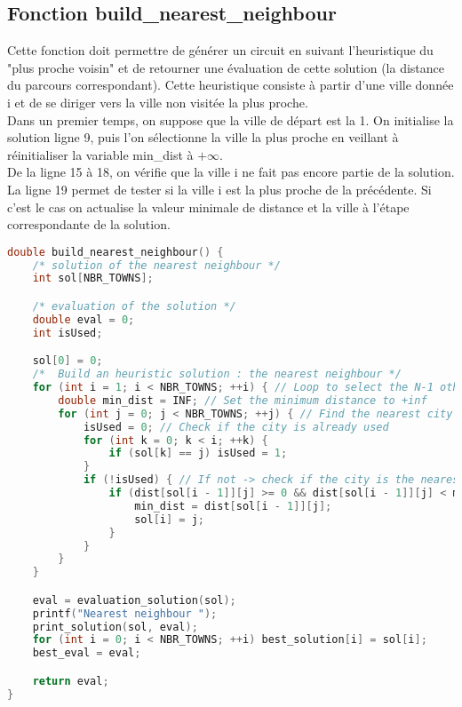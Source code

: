 \documentclass[a4paper]{article}
\begin{document}
\subsection{Fonction build\_nearest\_neighbour}

Cette fonction doit permettre de générer un circuit en suivant l'heuristique du "plus proche voisin" et de retourner une évaluation de cette solution (la distance du parcours correspondant). Cette heuristique consiste à partir d'une ville donnée i et de se diriger vers la ville non visitée la plus proche.\\

Dans un premier temps, on suppose que la ville de départ est la 1. On initialise la solution ligne 9, puis l'on sélectionne la ville la plus proche en veillant à réinitialiser la variable min\_dist à $+\infty$.\\ De la ligne 15 à 18, on vérifie que la ville i ne fait pas encore partie de la solution. La ligne 19 permet de tester si la ville i est la plus proche de la précédente. Si c'est le cas on actualise la valeur minimale de distance et la ville à l'étape correspondante de la solution.

\begin{lstlisting}[language=C]
    double build_nearest_neighbour() {
    /* solution of the nearest neighbour */
    int sol[NBR_TOWNS];

    /* evaluation of the solution */
    double eval = 0;
    int isUsed;

    sol[0] = 0;
    /*  Build an heuristic solution : the nearest neighbour */
    for (int i = 1; i < NBR_TOWNS; ++i) { // Loop to select the N-1 other cities' rank in the solution
        double min_dist = INF; // Set the minimum distance to +inf
        for (int j = 0; j < NBR_TOWNS; ++j) { // Find the nearest city for each step
            isUsed = 0; // Check if the city is already used
            for (int k = 0; k < i; ++k) {
                if (sol[k] == j) isUsed = 1;
            }
            if (!isUsed) { // If not -> check if the city is the nearest
                if (dist[sol[i - 1]][j] >= 0 && dist[sol[i - 1]][j] < min_dist) {
                    min_dist = dist[sol[i - 1]][j];
                    sol[i] = j;
                }
            }
        }
    }

    eval = evaluation_solution(sol);
    printf("Nearest neighbour ");
    print_solution(sol, eval);
    for (int i = 0; i < NBR_TOWNS; ++i) best_solution[i] = sol[i];
    best_eval = eval;

    return eval;
}
\end{lstlisting}
\end{document}
